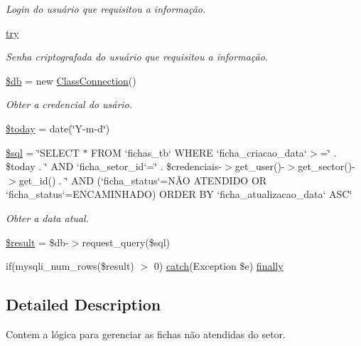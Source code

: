 \begin{DoxyCompactItemize}
\begin{DoxyCompactList}\small\item\em Login do usuário que requisitou a informação. \end{DoxyCompactList}\item 
\hyperlink{nao_atendidos_8php_abe4cc9788f52e49485473dc699537388}{try}
\begin{DoxyCompactList}\small\item\em Senha criptografada do usuário que requisitou a informação. \end{DoxyCompactList}\item 
\hyperlink{nao_atendidos_8php_a1fa3127fc82f96b1436d871ef02be319}{\$db} = new \hyperlink{class_class_connection}{Class\+Connection}()
\begin{DoxyCompactList}\small\item\em Obter a credencial do usário. \end{DoxyCompactList}\item 
\hyperlink{nao_atendidos_8php_af1b7fb9d06cdc6d22c14741fc3cc185a}{\$today} = date(\char`\"{}Y-\/m-\/d\char`\"{})
\item 
\hyperlink{nao_atendidos_8php_a047170d6020a882807665812a27e2525}{\$sql} = \char`\"{}S\+E\+L\+E\+CT $\ast$ F\+R\+OM `fichas\+\_\+tb` W\+H\+E\+RE `ficha\+\_\+criacao\+\_\+data`$>$=\textquotesingle{}\char`\"{} . \$today . \char`\"{}\textquotesingle{} A\+ND `ficha\+\_\+setor\+\_\+id`=\char`\"{} . \$credenciais-\/$>$get\+\_\+user()-\/$>$get\+\_\+sector()-\/$>$get\+\_\+id() . \char`\"{} A\+ND (`ficha\+\_\+status`=\textquotesingle{}NÃO A\+T\+E\+N\+D\+I\+DO\textquotesingle{} OR `ficha\+\_\+status`=\textquotesingle{}E\+N\+C\+A\+M\+I\+N\+H\+A\+DO\textquotesingle{}) O\+R\+D\+ER BY `ficha\+\_\+atualizacao\+\_\+data` A\+SC\char`\"{}
\begin{DoxyCompactList}\small\item\em Obter a data atual. \end{DoxyCompactList}\item 
\hyperlink{nao_atendidos_8php_a112ef069ddc0454086e3d1e6d8d55d07}{\$result} = \$db-\/$>$request\+\_\+query(\$sql)
\item 
if(mysqli\+\_\+num\+\_\+rows(\$result) $>$ 0) \hyperlink{imprimir_2ficha_2index_8php_a8104793004944f01dd070fc8b1ade3c4}{catch}(Exception \$e) \hyperlink{nao_atendidos_8php_af7cfe1f8cb9dba05c425311a444e3fb4}{finally}
\end{DoxyCompactItemize}


\subsection{Detailed Description}
Contem a lógica para gerenciar as fichas não atendidas do setor. 

